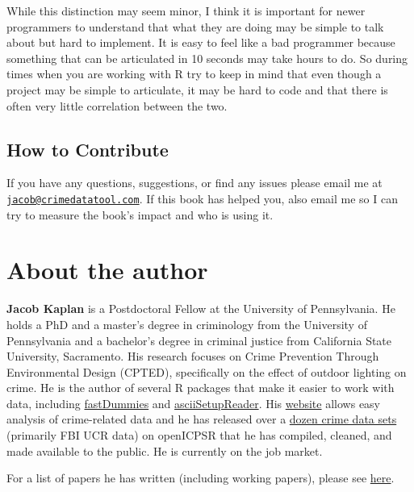 \documentclass[
  12pt,
]{book}
\begin{document}
While this distinction may seem minor, I think it is important for newer programmers to understand that what they are doing may be simple to talk about but hard to implement. It is easy to feel like a bad programmer because something that can be articulated in 10 seconds may take hours to do. So during times when you are working with R try to keep in mind that even though a project may be simple to articulate, it may be hard to code and that there is often very little correlation between the two.

\hypertarget{how-to-contribute}{%
\section*{How to Contribute}\label{how-to-contribute}}

If you have any questions, suggestions, or find any issues please email me at \href{mailto:jacob@crimedatatool.com}{\nolinkurl{jacob@crimedatatool.com}}. If this book has helped you, also email me so I can try to measure the book's impact and who is using it.

\hypertarget{about-the-author}{%
\chapter*{About the author}\label{about-the-author}}

\textbf{Jacob Kaplan} is a Postdoctoral Fellow at the University of Pennsylvania. He holds a PhD and a master's degree in criminology from the University of Pennsylvania and a bachelor's degree in criminal justice from California State University, Sacramento. His research focuses on Crime Prevention Through Environmental Design (CPTED), specifically on the effect of outdoor lighting on crime. He is the author of several R packages that make it easier to work with data, including \href{https://jacobkap.github.io/fastDummies/}{fastDummies} and \href{https://jacobkap.github.io/asciiSetupReader/}{asciiSetupReader}. His \href{http://jacobdkaplan.com/}{website} allows easy analysis of crime-related data and he has released over a \href{http://jacobdkaplan.com/data.html}{dozen crime data sets} (primarily FBI UCR data) on openICPSR that he has compiled, cleaned, and made available to the public. He is currently on the job market.

For a list of papers he has written (including working papers), please see \href{http://jacobdkaplan.com/research.html}{here}.
\end{document}
